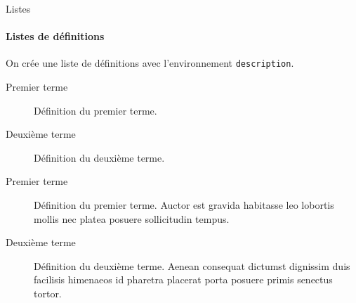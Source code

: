 \begin{frame}[c, fragile]{Listes}
	\framesubtitle{Listes de définitions}
	
	On crée une liste de définitions avec l'environnement \texttt{description}.
	
\begin{codesource}
	\begin{description}
		\item[Premier terme] Définition du premier terme.
		\item[Deuxième terme] Définition du deuxième terme.
	\end{description}
\end{codesource}

	\begin{description}
		\item[Premier terme] Définition du premier terme. Auctor est gravida habitasse leo lobortis mollis nec platea posuere
		 sollicitudin tempus.
		\item[Deuxième terme] Définition du deuxième terme. Aenean consequat dictumst dignissim duis facilisis himenaeos id
		 pharetra placerat porta posuere primis senectus tortor.
	\end{description}
\end{frame}

